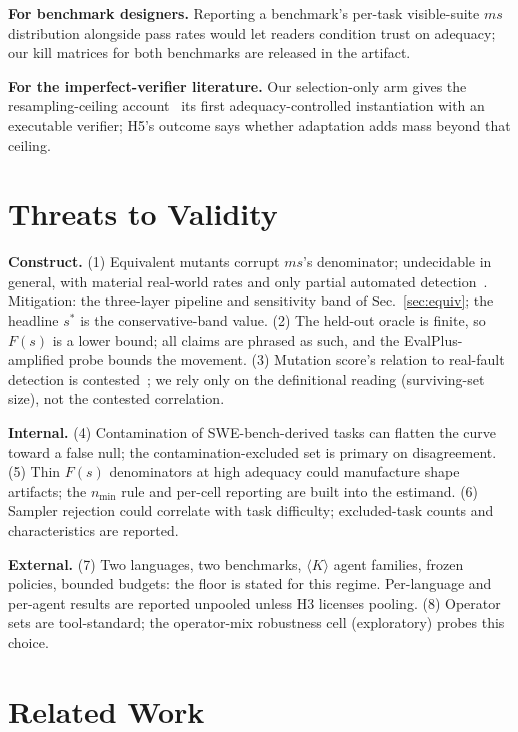 \documentclass[conference]{IEEEtran}
\newcommand{\PH}[1]{\colorbox{gray!18}{\small$\langle$#1$\rangle$}}
\newcommand{\ms}{\ensuremath{\mathit{ms}}}
\newcommand{\Fs}{\ensuremath{F(s)}}
\begin{document}
\textbf{For benchmark designers.} Reporting a benchmark's per-task
visible-suite \ms{} distribution alongside pass rates would let readers
condition trust on adequacy; our kill matrices for both benchmarks are
released in the artifact.

\textbf{For the imperfect-verifier literature.} Our selection-only arm
gives the resampling-ceiling account~\cite{ResamplingLimits_j8H84v6AZ1}
its first adequacy-controlled instantiation with an executable verifier;
H5's outcome says whether adaptation adds mass beyond that ceiling.

\section{Threats to Validity}\label{sec:threats}

\textbf{Construct.} (1) Equivalent mutants corrupt \ms{}'s denominator;
undecidable in general, with material real-world rates and only partial
automated detection~\cite{Papadakis2015TCE}. Mitigation: the three-layer
pipeline and sensitivity band of Sec.~\ref{sec:equiv}; the headline
$s^\ast$ is the conservative-band value. (2) The held-out oracle is
finite, so \Fs{} is a lower bound; all claims are phrased as such, and
the EvalPlus-amplified probe bounds the movement. (3) Mutation score's
relation to real-fault detection is contested~\cite{Just2014Valid}; we
rely only on the definitional reading (surviving-set size), not the
contested correlation.

\textbf{Internal.} (4) Contamination of SWE-bench-derived tasks can
flatten the curve toward a false null; the contamination-excluded set is
primary on disagreement. (5) Thin \Fs{} denominators at high adequacy
could manufacture shape artifacts; the $n_{\min}$ rule and per-cell
reporting are built into the estimand. (6) Sampler rejection could
correlate with task difficulty; excluded-task counts and characteristics
are reported.

\textbf{External.} (7) Two languages, two benchmarks, \PH{$K$} agent
families, frozen policies, bounded budgets: the floor is stated for this
regime. Per-language and per-agent results are reported unpooled unless
H3 licenses pooling. (8) Operator sets are tool-standard; the
operator-mix robustness cell (exploratory) probes this choice.

\section{Related Work}\label{sec:related}
\end{document}
